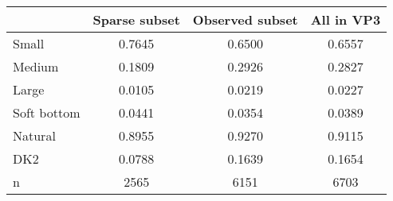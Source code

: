 \begin{tabular}{lccc}
\toprule
 & Sparse subset & Observed subset & All in VP3 \\
\midrule
Small & 0.7645 & 0.6500 & 0.6557 \\
Medium & 0.1809 & 0.2926 & 0.2827 \\
Large & 0.0105 & 0.0219 & 0.0227 \\
Soft bottom & 0.0441 & 0.0354 & 0.0389 \\
Natural & 0.8955 & 0.9270 & 0.9115 \\
DK2 & 0.0788 & 0.1639 & 0.1654 \\
n & 2565 & 6151 & 6703 \\
\bottomrule
\end{tabular}
